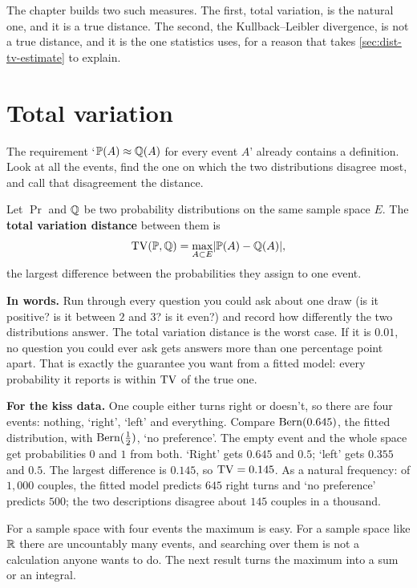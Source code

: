 The chapter builds two such measures.
The first, total variation, is the natural one, and it is a true distance.
The second, the Kullback--Leibler divergence, is not a true distance, and it is the one statistics uses, for a reason that takes \cref{sec:dist-tv-estimate} to explain.

\section{Total variation}
\label{sec:dist-tv}

The requirement `$\mathbb{P}(A) \approx \mathbb{Q}(A)$ for every event $A$' already contains a definition.
Look at all the events, find the one on which the two distributions disagree most, and call that disagreement the distance.

\begin{definition}
\label{def:tv}
Let $\Pr$ and $\mathbb{Q}$ be two probability distributions on the same sample space $E$.
The \textbf{total variation distance} between them is
\[
\mathrm{TV}(\mathbb{P}, \mathbb{Q}) = \max_{A \subset E} \lvert\mathbb{P}(A) - \mathbb{Q}(A)\rvert,
\]
the largest difference between the probabilities they assign to one event.
\end{definition}

\begin{inwords}
\textbf{In words.} Run through every question you could ask about one draw (is it positive? is it between $2$ and $3$? is it even?) and record how differently the two distributions answer. The total variation distance is the worst case. If it is $0.01$, no question you could ever ask gets answers more than one percentage point apart. That is exactly the guarantee you want from a fitted model: every probability it reports is within $\mathrm{TV}$ of the true one.
\par\smallskip
\textbf{For the kiss data.} One couple either turns right or doesn't, so there are four events: nothing, `right', `left' and everything. Compare $\text{Bern}(0.645)$, the fitted distribution, with $\text{Bern}(\frac12)$, `no preference'. The empty event and the whole space get probabilities $0$ and $1$ from both. `Right' gets $0.645$ and $0.5$; `left' gets $0.355$ and $0.5$. The largest difference is $0.145$, so $\mathrm{TV} = 0.145$. As a natural frequency: of $1{,}000$ couples, the fitted model predicts $645$ right turns and `no preference' predicts $500$; the two descriptions disagree about $145$ couples in a thousand.
\end{inwords}

For a sample space with four events the maximum is easy.
For a sample space like $\mathbb{R}$ there are uncountably many events, and searching over them is not a calculation anyone wants to do.
The next result turns the maximum into a sum or an integral.

